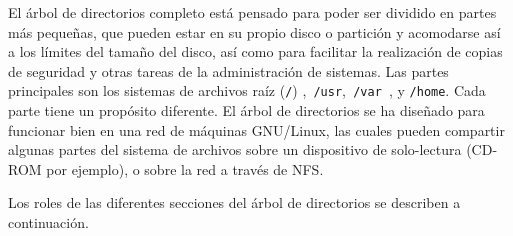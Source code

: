 \documentclass[12pt]{article}
\begin{document}
El árbol de directorios completo está pensado para poder ser dividido en
partes más pequeñas, que pueden estar en su propio disco o partición y
acomodarse así a los límites del tamaño del disco, así como para facilitar la
realización de  copias de seguridad y otras tareas de la administración de
sistemas. Las partes principales son los sistemas de archivos raíz
(\texttt{/}) ,\texttt{ /usr},\texttt{ /var
}, y \texttt{/home}. Cada parte tiene un propósito
diferente. El árbol de directorios se ha diseñado para funcionar bien en una red
de máquinas GNU/Linux, las cuales pueden compartir algunas partes del sistema de
archivos sobre un dispositivo de solo-lectura (CD-ROM por ejemplo), o sobre la
red a través de NFS.  




 Los roles de las diferentes secciones del árbol de directorios se
describen a continuación.  
\end{document}
